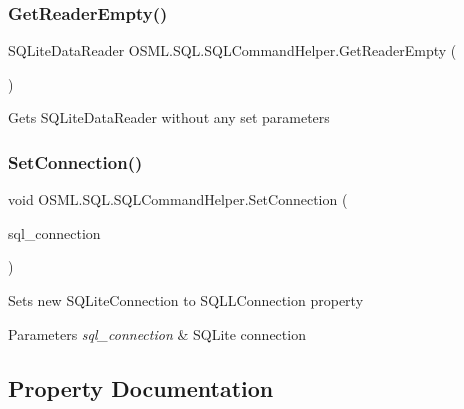 \subsubsection{\texorpdfstring{GetReaderEmpty()}{GetReaderEmpty()}}
{\footnotesize\ttfamily S\+Q\+Lite\+Data\+Reader O\+S\+M\+L.\+S\+Q\+L.\+S\+Q\+L\+Command\+Helper.\+Get\+Reader\+Empty (\begin{DoxyParamCaption}{ }\end{DoxyParamCaption})\hspace{0.3cm}{\ttfamily [inline]}}



Gets S\+Q\+Lite\+Data\+Reader without any set parameters 

\mbox{\label{classOSML_1_1SQL_1_1SQLCommandHelper_aac343844e6797a8ebf9508b622ea9d70}} 
\subsubsection{\texorpdfstring{SetConnection()}{SetConnection()}}
{\footnotesize\ttfamily void O\+S\+M\+L.\+S\+Q\+L.\+S\+Q\+L\+Command\+Helper.\+Set\+Connection (\begin{DoxyParamCaption}\item[{S\+Q\+Lite\+Connection}]{sql\+\_\+connection }\end{DoxyParamCaption})\hspace{0.3cm}{\ttfamily [inline]}}



Sets new S\+Q\+Lite\+Connection to S\+Q\+L\+L\+Connection property 


\begin{DoxyParams}{Parameters}
{\em sql\+\_\+connection} & S\+Q\+Lite connection\\
\hline
\end{DoxyParams}


\subsection{Property Documentation}
\mbox{\label{classOSML_1_1SQL_1_1SQLCommandHelper_a63fd14fd128d424031298589ea073745}} 
